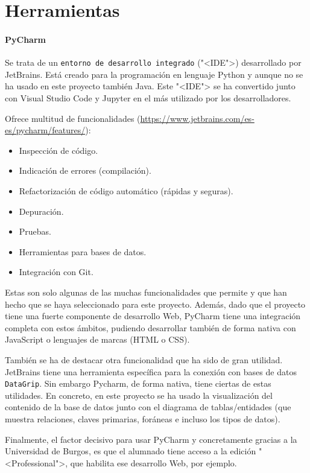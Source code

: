 \section{Herramientas}

\paragraph{PyCharm}
Se trata de un \texttt{entorno de desarrollo integrado} ("<IDE">) desarrollado
por JetBrains. Está creado para la programación en lenguaje Python y aunque no
se ha usado en este proyecto también Java. Este "<IDE"> se ha convertido junto
con Visual Studio Code y Jupyter en el más utilizado por los desarrolladores.

Ofrece multitud de funcionalidades
(\url{https://www.jetbrains.com/es-es/pycharm/features/}):
\begin{itemize}
	\item Inspección de código.
	\item Indicación de errores (compilación).
	\item Refactorización de código automático (rápidas y seguras).
	\item Depuración.
	\item Pruebas.
	\item Herramientas para bases de datos.
	\item Integración con Git.
\end{itemize}

Estas son solo algunas de las muchas funcionalidades que permite y que han hecho
que se haya seleccionado para este proyecto. Además, dado que el proyecto tiene
una fuerte componente de desarrollo Web, PyCharm tiene una integración completa
con estos ámbitos, pudiendo desarrollar también de forma nativa con JavaScript o
lenguajes de marcas (HTML o CSS).

También se ha de destacar otra funcionalidad que ha sido de gran utilidad.
JetBrains tiene una herramienta específica para la conexión con bases de datos
\texttt{DataGrip}. Sin embargo Pycharm, de forma nativa, tiene ciertas de estas
utilidades. En concreto, en este proyecto se ha usado la visualización del
contenido de la base de datos junto con el diagrama de tablas/entidades (que
muestra relaciones, claves primarias, foráneas e incluso los tipos de datos).

Finalmente, el factor decisivo para usar PyCharm y concretamente gracias a la
Universidad de Burgos, es que el alumnado tiene acceso a la edición
"<Professional">, que habilita ese desarrollo Web, por ejemplo.

